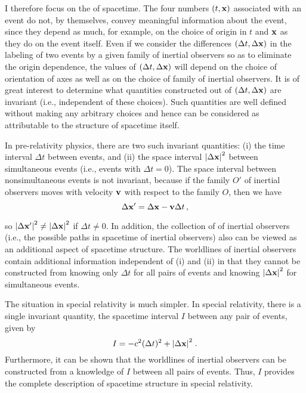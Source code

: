 I therefore focus on the  of spacetime. The four numbers $(t, \vb{x})$ associated with an event do not, by themselves, convey meaningful information about the event, since they depend as much, for example, on the choice of origin in $t$ and $\vb{x}$ as they do on the event itself. Even if we consider the differences $(\Delta t, \Delta \vb{x})$ in the labeling of two events by a given family of inertial observers so as to eliminate the origin dependence, the values of $(\Delta t, \Delta \vb{x})$ will depend on the choice of orientation of axes as well as on the choice of family of inertial observers. It is of great interest to determine what quantities constructed out of $(\Delta t, \Delta \vb{x})$ are invariant (i.e., independent of these choices). Such quantities are well defined without making any arbitrary choices and hence can be considered as attributable to the structure of spacetime itself. 

In pre-relativity physics, there are two such invariant quantities: (i) the time interval $\Delta t$ between events, and (ii) the space interval $\abs{\Delta \vb{x}}^2$ between simultaneous events (i.e., events with $\Delta t = 0$). The space interval between nonsimultaneous events is not invariant, because if the family $O'$ of inertial observers moves with velocity $\vb{v}$ with respect to the family $O$, then we have 
\begin{equation}\label{eq:8.1}
\Delta \vb{x}' = \Delta \vb{x} - \vb{v} \Delta t\,,
\end{equation}

so $\abs{\Delta \vb{x}'}^2 \neq \abs{\Delta \vb{x}}^2$ if $\Delta t \neq 0$.  In addition, the collection of  of inertial observers (i.e., the possible paths in spacetime of inertial observers) also can be viewed as an additional aspect of spacetime structure. The worldlines of inertial observers contain additional information independent of (i) and (ii) in that they cannot be constructed from knowing only $\Delta t$ for all pairs of events and knowing $\abs{\Delta \vb{x}}^2$ for simultaneous events. 

The situation in special relativity is much simpler. In special relativity, there is a single invariant quantity, the spacetime interval $I$ between any pair of events, given by 
\begin{equation}\label{eq:8.2}
I = - c^2 (\Delta t)^2 + \abs{\Delta \vb{x}}^2\;.
\end{equation}
 Furthermore, it can be shown that the worldlines of inertial observers can be constructed from a knowledge of $I$ between all pairs of events. Thus, $I$ provides the complete description of spacetime structure in special relativity. 
 
